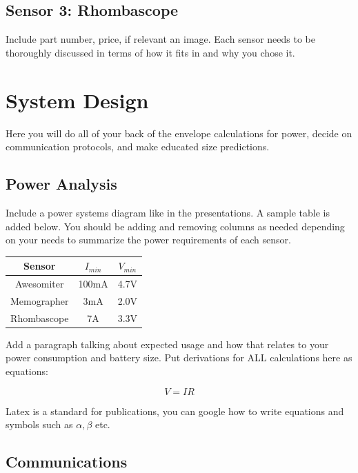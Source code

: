 \documentclass{sig-alternate-ipsn13}
\begin{document}
\subsection{Sensor 3: Rhombascope}

Include part number, price, if relevant an image. Each sensor needs to be thoroughly discussed in terms of how it fits in and why you chose it.


\section{System Design} 

Here you will do all of your back of the envelope calculations for power, decide on communication protocols, and make educated size predictions. 

\subsection{Power Analysis}

Include a power systems diagram like in the presentations. A sample table is added below. You should be adding and removing columns as needed depending on your needs to summarize the power requirements of each sensor.

\begin{center}
\begin{tabular}{|c|c|c|}
\hline
 Sensor & $I_{min}$ & $V_{min}$ \\ 
 \hline
 Awesomiter & 100mA & 4.7V \\  
 Memographer & 3mA & 2.0V \\
 Rhombascope & 7A & 3.3V \\
 \hline
\end{tabular}
\end{center}

Add a paragraph talking about expected usage and how that relates to your power consumption and battery size. Put derivations for ALL calculations here as equations:

\begin{equation}
V = IR
\end{equation}

Latex is a standard for publications, you can google how to write equations and symbols such as $\alpha,\beta$ etc. 

\subsection{Communications}
\end{document}
